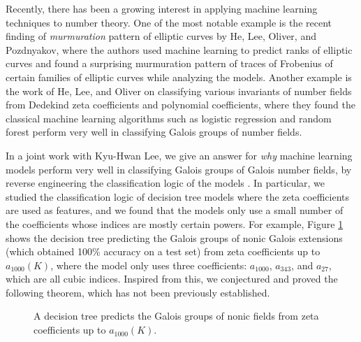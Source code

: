 \documentclass[letterpaper, 10pt]{article}
\begin{document}
Recently, there has been a growing interest in applying machine learning techniques to number theory.
One of the most notable example is the recent finding of \emph{murmuration} pattern of elliptic curves \cite{he2024murmurations} by He, Lee, Oliver, and Pozdnyakov, where the authors used machine learning to predict ranks of elliptic curves and found a surprising murmuration pattern of traces of Frobenius of certain families of elliptic curves while analyzing the models.
Another example is the work of He, Lee, and Oliver \cite{he2020machine} on classifying various invariants of number fields from Dedekind zeta coefficients and polynomial coefficients, where they found the classical machine learning algorithms such as logistic regression and random forest perform very well in classifying Galois groups of number fields.

In a joint work with Kyu-Hwan Lee, we give an answer for \emph{why} machine learning models perform very well in classifying Galois groups of Galois number fields, by reverse engineering the classification logic of the models \cite{lee2025machines}.
In particular, we studied the classification logic of decision tree models where the zeta coefficients are used as features, and we found that the models only use a small number of the coefficients whose indices are mostly certain powers.
For example, Figure \ref{fig:nonic_zeta_dt} shows the decision tree predicting the Galois groups of nonic Galois extensions (which obtained 100\% accuracy on a test set) from zeta coefficients up to $a_{1000}(K)$, where the model only uses three coefficients: $a_{1000}$, $a_{343}$, and $a_{27}$, which are all cubic indices.
Inspired from this, we conjectured and proved the following theorem, which has not been previously established.

\begin{figure}[t]
    \centering
    \footnotesize
    \caption{A decision tree predicts the Galois groups of nonic fields from zeta coefficients up to $a_{1000}(K)$.}
    \label{fig:nonic_zeta_dt}
\end{figure}
\end{document}
